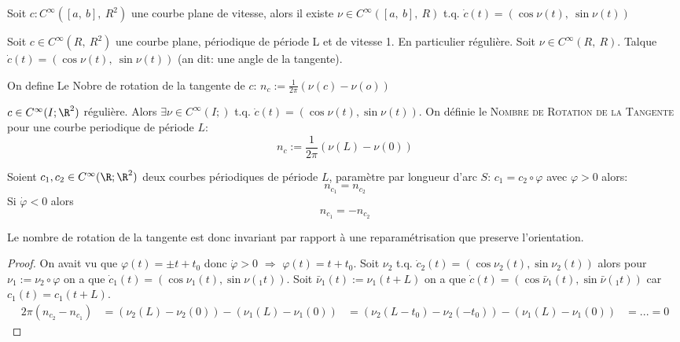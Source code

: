 		\begin{lemme}
			Soit $c:C^\infty([a,\ b],\ R^2)$ une courbe plane de vitesse, alors il existe $\nu\in C^\infty([a,\ b],\ R)$ t.q. $\dot{c}(t)=(\cos\nu(t),\ \sin\nu(t))$
		\end{lemme}

		\begin{definition}
			Soit $c\in C^\infty(R,\ R^2)$ une courbe plane, périodique de période L et de vitesse 1. En particulier régulière. Soit $\nu\in C^\infty(R,\ R)$.
			Talque $\dot{c}(t)=(\cos \nu (t),\ \sin\nu(t))$ (an dit: une angle de la tangente).
	
			On define Le Nobre de rotation de la tangente de $c$: $n_c:=\frac{1}{2\pi}(\nu(c)-\nu(o))$
		\end{definition}
\begin{rappel}
$c\in C^\infty(I; \R^2)$ régulière. Alors $\exists\nu\in C^\infty (I; )$ t.q. $\dot{c}(t)=(\cos \nu(t), \sin\nu(t))$. On définie le \textsc{Nombre de Rotation de la Tangente} pour une courbe periodique de période $L$:
		$$n_c:=\frac{1}{2\pi}(\nu (L)-\nu(0))$$
\end{rappel}
	
		\begin{lemme}
			Soient $c_1, c_2\in C^\infty (\R; \R^2)$ deux courbes périodiques de période $L$, paramètre par longueur d'arc $S$: $c_1=c_2\circ\varphi$ avec $\varphi>0 $ alors:
			$$n_{c_1}=n_{c_2}$$
			Si $\dot{\varphi}<0$ alors
			$$n_{c_1}=-n_{c_2}$$
		\end{lemme}
		\begin{remark}
			Le nombre de rotation de la tangente est donc invariant par rapport à une reparamétrisation que preserve l'orientation.
		\end{remark}
		\begin{proof}
			On avait vu que $\varphi(t)=\pm t+t_0$ donc $\dot{\varphi}>0$ $\Rightarrow$  $\varphi (t)=t+t_0$. Soit $\nu_2$ t.q. $\dot{c}_2(t)=(\cos\nu_2(t), \sin\nu_2(t))$ alors pour $\nu_1:=\nu_2\circ\varphi$ on a que $\dot{c}_1(t)=(\cos\nu_1(t), \sin\nu(_1t))$. Soit $\bar{\nu}_1(t):=\nu_1(t+L)$ on a que $\dot{c}(t)=(\cos\bar{\nu}_1(t), \sin\bar{\nu}(_1t))$ car $c_1(t)=c_1(t+L)$.
			\begin{align}
				2\pi(n_{c_2}-n_{c_1}) & = (\nu_2(L)-\nu_2(0))-(\nu_1(L)-\nu_1(0))
				& =(\nu_2(L-t_0)-\nu_2(-t_0)) - (\nu_1(L)-\nu_1(0))
				& = ...
				=0
			\end{align}
		\end{proof}


